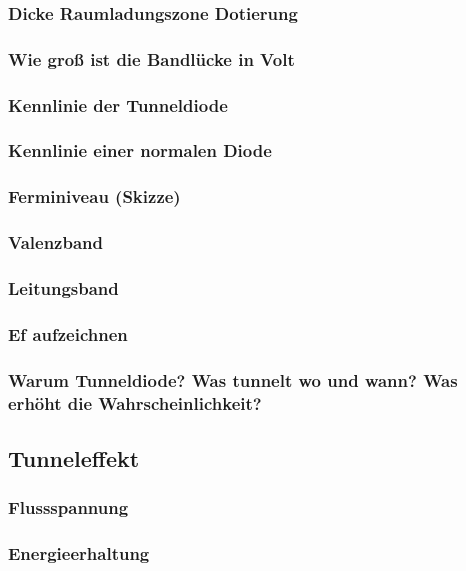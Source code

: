 \documentclass{article}
\begin{document}
    \subsubsection{Dicke Raumladungszone Dotierung}
    \subsubsection{Wie groß ist die Bandlücke in Volt}
    \subsubsection{Kennlinie der Tunneldiode}
    \subsubsection{Kennlinie einer normalen Diode}
    
    \subsubsection{Ferminiveau (Skizze)}
    \subsubsection{Valenzband}
    \subsubsection{Leitungsband}
    \subsubsection{Ef aufzeichnen}

    \subsubsection{Warum Tunneldiode? Was tunnelt wo und wann? Was erhöht die Wahrscheinlichkeit?}

\subsection{Tunneleffekt }\label{k5:tunnelEffekt}
    \subsubsection{Flussspannung}
    \subsubsection{Energieerhaltung}
\end{document}
